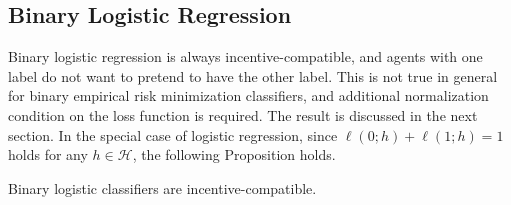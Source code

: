 \documentclass{article}
\begin{document}
\subsection{Binary Logistic Regression}
Binary logistic regression is always incentive-compatible, and agents with one label do not want to pretend to have the other label. This is not true in general for binary empirical risk minimization classifiers, and additional normalization condition on the loss function is required. The result is discussed in the next section. In the special case of logistic regression, since $\ell\left(0 ; h\right) + \ell\left(1 ; h\right) = 1$ holds for any $h  \in \mathcal{H}$, the following Proposition holds.
\newline \newline
\begin{prop} \label{prop:bin} 
Binary logistic classifiers are incentive-compatible.
\end{prop}
\end{document}
